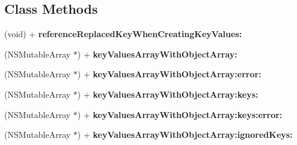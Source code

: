 \subsection*{Class Methods}
\begin{DoxyCompactItemize}
\item 
\mbox{\label{category_n_s_object_07_m_j_key_value_deprecated__v__2__5__16_08_a912b55aab22b8be7aad15e7411cc5247}} 
(void) + {\bfseries reference\+Replaced\+Key\+When\+Creating\+Key\+Values\+:}
\item 
\mbox{\label{category_n_s_object_07_m_j_key_value_deprecated__v__2__5__16_08_aaecbe43cc73cb6f04ecf85a75c00a65b}} 
(N\+S\+Mutable\+Array $\ast$) + {\bfseries key\+Values\+Array\+With\+Object\+Array\+:}
\item 
\mbox{\label{category_n_s_object_07_m_j_key_value_deprecated__v__2__5__16_08_aa21e6039a7faa760c9431ca5b74c0ab5}} 
(N\+S\+Mutable\+Array $\ast$) + {\bfseries key\+Values\+Array\+With\+Object\+Array\+:error\+:}
\item 
\mbox{\label{category_n_s_object_07_m_j_key_value_deprecated__v__2__5__16_08_aae785ad93c54ac5ce9751f4e3063cc75}} 
(N\+S\+Mutable\+Array $\ast$) + {\bfseries key\+Values\+Array\+With\+Object\+Array\+:keys\+:}
\item 
\mbox{\label{category_n_s_object_07_m_j_key_value_deprecated__v__2__5__16_08_a4a3543790c3ff33400e1b4a68347a127}} 
(N\+S\+Mutable\+Array $\ast$) + {\bfseries key\+Values\+Array\+With\+Object\+Array\+:keys\+:error\+:}
\item 
\mbox{\label{category_n_s_object_07_m_j_key_value_deprecated__v__2__5__16_08_a3c3c9fb71e60f37ba3d2ad9b7d52fdb4}} 
(N\+S\+Mutable\+Array $\ast$) + {\bfseries key\+Values\+Array\+With\+Object\+Array\+:ignored\+Keys\+:}
\item 
\mbox{\label{category_n_s_object_07_m_j_key_value_deprecated__v__2__5__16_08_a6df5aab06c3ebca1103e56b783cca91a}} 

\end{DoxyCompactItemize}
